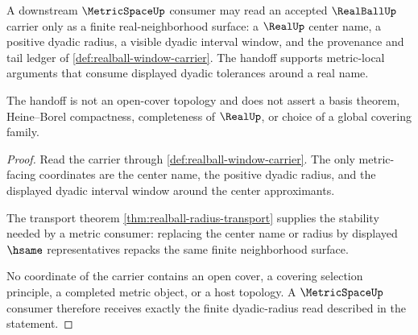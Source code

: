 \begin{theorem}
\label{thm:realball-metric-neighborhood-handoff}
A downstream $\MetricSpaceUp$ consumer may read an accepted $\RealBallUp$ carrier only as a finite real-neighborhood surface: a $\RealUp$ center name, a positive dyadic radius, a visible dyadic interval window, and the provenance and tail ledger of \autoref{def:realball-window-carrier}. The handoff supports metric-local arguments that consume displayed dyadic tolerances around a real name.

The handoff is not an open-cover topology and does not assert a basis theorem, Heine--Borel compactness, completeness of $\RealUp$, or choice of a global covering family.
\end{theorem}
\begin{proof}
Read the carrier through \autoref{def:realball-window-carrier}. The only metric-facing coordinates are the center name, the positive dyadic radius, and the displayed dyadic interval window around the center approximants.

The transport theorem \autoref{thm:realball-radius-transport} supplies the stability needed by a metric consumer: replacing the center name or radius by displayed $\hsame$ representatives repacks the same finite neighborhood surface.

No coordinate of the carrier contains an open cover, a covering selection principle, a completed metric object, or a host topology. A $\MetricSpaceUp$ consumer therefore receives exactly the finite dyadic-radius read described in the statement.
\end{proof}

